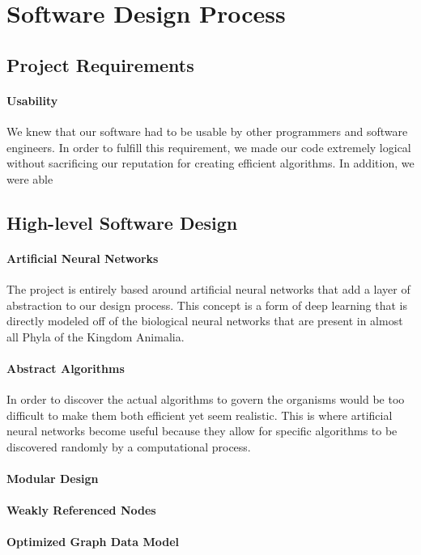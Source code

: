 \documentclass[letterpaper, 10pt]{article}
\begin{document}
	\normalsize
	
\cleardoublepage
\section{Software Design Process}
	\subsection{Project Requirements}
		\paragraph{Usability} We knew that our software had to be usable by other programmers and software engineers. In order to fulfill this requirement, we made our code extremely logical without sacrificing our reputation for creating efficient algorithms. In addition, we were able 
		
		
	\subsection{High-level Software Design}
		\paragraph{Artificial Neural Networks}
		The project is entirely based around artificial neural networks that add a layer of abstraction to our design process. This concept is a form of deep learning that is directly modeled off of the biological neural networks that are present in almost all Phyla of the Kingdom Animalia.
		\paragraph{Abstract Algorithms}
		In order to discover the actual algorithms to govern the organisms would be too difficult to make them both efficient yet seem realistic. This is where artificial neural networks become useful because they allow for specific algorithms to be discovered randomly by a computational process.
		\paragraph{Modular Design}
		\paragraph{Weakly Referenced Nodes}
		\paragraph{Optimized Graph Data Model}
\end{document}
